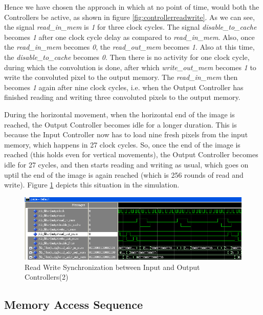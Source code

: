 \documentclass[11pt,a4paper]{article}
\begin{document}
Hence we have chosen the approach in which at no point of time, would both the Controllers be active, as shown in figure \ref{fig:controllerreadwrite}. As we can see, the signal \textit{read\_in\_mem} is \textit{1} for three clock cycles. The signal \textit{disable\_to\_cache} becomes \textit{1} after one clock cycle delay as compared to \textit{read\_in\_mem}. Also, once the \textit{read\_in\_mem} becomes \textit{0}, the \textit{read\_out\_mem} becomes \textit{1}. Also at this time, the \textit{disable\_to\_cache} becomes \textit{0}. Then there is no activity for one clock cycle, during which the convolution is done, after which \textit{write\_out\_mem} becomes \textit{1} to write the convoluted pixel to the output memory. The \textit{read\_in\_mem} then becomes \textit{1} again after nine clock cycles, i.e. when the Output Controller has finished reading and writing three convoluted pixels to the output memory.

During the horizontal movement, when the horizontal end of the image is reached, the Output Controller becomes idle for a longer duration. This is because the Input Controller now has to load nine fresh pixels from the input memory, which happens in 27 clock cycles. So, once the end of the image is reached (this holds even for vertical movements), the Output Controller becomes idle for 27 cycles, and then starts reading and writing as usual, which goes on uptil the end of the image is again reached (which is 256 rounds of read and write). Figure \ref{fig:controllerreadwrite2} depicts this situation in the simulation.
 
\begin{figure}[h]
	\centering
		\includegraphics[width=6in]{./images/controllerreadwrite2.PNG}
	\caption{Read Write Synchronization between Input and Output Controllers(2)}	
	\label{fig:controllerreadwrite2}
\end{figure}



\subsection{Memory Access Sequence}
\label{sec:memoryaccess}
\end{document}

